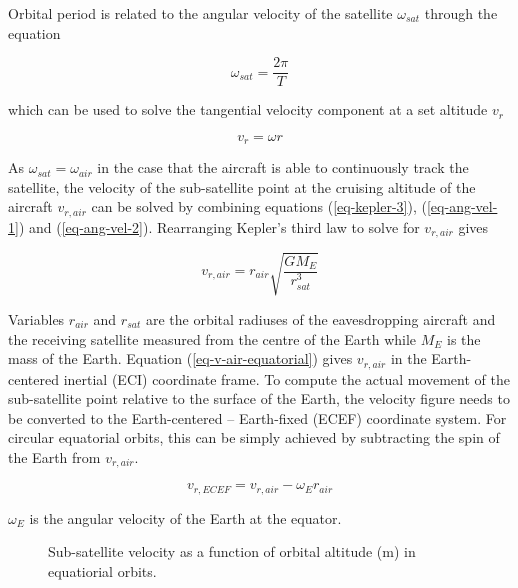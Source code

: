 \documentclass[english, 12pt, a4paper, elec, utf8, a-1b, online]{aaltothesis}
\begin{document}
Orbital period is related to the angular velocity of the satellite $\omega_{sat}$ through the equation

\begin{equation} \label{eq-ang-vel-1}
  \omega_{sat} = \frac{2\pi}{T}
\end{equation}

\noindent
which can be used to solve the tangential velocity component at a set altitude $v_r$

\begin{equation} \label{eq-ang-vel-2}
  v_r = \omega r
\end{equation}

\noindent
As $\omega_{sat} = \omega_{air}$ in the case that the aircraft is able to continuously track the satellite, the velocity of the sub-satellite point at the cruising altitude of the aircraft $v_{r, air}$ can be solved by combining equations (\ref{eq-kepler-3}), (\ref{eq-ang-vel-1}) and (\ref{eq-ang-vel-2}).
Rearranging Kepler's third law to solve for $v_{r, air}$ gives

\begin{equation} \label{eq-v-air-equatorial}
  v_{r, air} = r_{air} \sqrt{\frac{G M_E}{r_{sat}^3}}
\end{equation}

\noindent
Variables $r_{air}$ and $r_{sat}$ are the orbital radiuses of the eavesdropping aircraft and the receiving satellite measured from the centre of the Earth while $M_E$ is the mass of the Earth.
Equation (\ref{eq-v-air-equatorial}) gives $v_{r, air}$ in the Earth-centered inertial (ECI) coordinate frame.
To compute the actual movement of the sub-satellite point relative to the surface of the Earth, the velocity figure needs to be converted to the Earth-centered -- Earth-fixed (ECEF) coordinate system.
For circular equatorial orbits, this can be simply achieved by subtracting the spin of the Earth from $v_{r, air}$.

\begin{equation}
  v_{r, ECEF} = v_{r, air} - \omega_E r_{air}
\end{equation}

\noindent
$\omega_E$ is the angular velocity of the Earth at the equator.

\begin{figure}[h]
  \centering
  
  \caption{Sub-satellite velocity as a function of orbital altitude (m) in equatiorial orbits.}
  \label{fig-subsat-velocity-equatiorial}
\end{figure}
\end{document}
